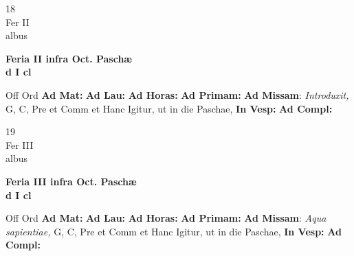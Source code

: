 \documentclass[10pt, openany]{book}
\begin{document}
    \begin{center}
        \begin{minipage}{3.5in}
            \vspace{2em}
            \begin{minipage}{0.5in}
                {\Huge 18} \\
                {\normalsize Fer II} \\
                {\normalsize albus}
            \end{minipage}
            \begin{minipage}{3.0in}
                \textbf{ \large Feria II infra Oct. Paschæ \\
                \textnormal{\normalsize d I cl}} \\ 
            \end{minipage}
            \begin{justify}Off Ord
                \textbf{Ad Mat: }
                \textbf{Ad Lau: }
                \textbf{Ad Horas: }
                \textbf{Ad Primam: }\textbf{Ad Missam}: \textit{Introduxit,} G, C, Pre et Comm et Hanc Igitur, ut in die Paschae,  
                \textbf{In Vesp: }
                \textbf{Ad Compl: }
            \end{justify}
        \end{minipage}
    \end{center}

    \begin{center}
        \begin{minipage}{3.5in}
            \vspace{2em}
            \begin{minipage}{0.5in}
                {\Huge 19} \\
                {\normalsize Fer III} \\
                {\normalsize albus}
            \end{minipage}
            \begin{minipage}{3.0in}
                \textbf{ \large Feria III infra Oct. Paschæ \\
                \textnormal{\normalsize d I cl}} \\ 
            \end{minipage}
            \begin{justify}Off Ord
                \textbf{Ad Mat: }
                \textbf{Ad Lau: }
                \textbf{Ad Horas: }
                \textbf{Ad Primam: }\textbf{Ad Missam}: \textit{Aqua sapientiae,} G, C, Pre et Comm et Hanc Igitur, ut in die Paschae,  
                \textbf{In Vesp: }
                \textbf{Ad Compl: }
            \end{justify}
        \end{minipage}
    \end{center}
\end{document}
